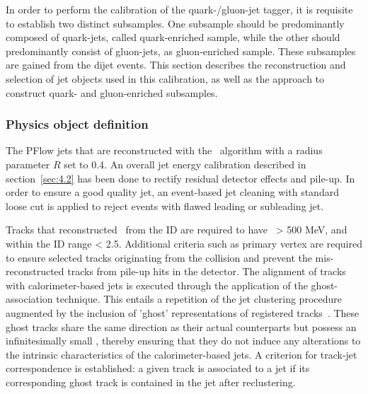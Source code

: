 In order to perform the calibration of the quark-/gluon-jet tagger, it is requisite to establish two distinct subsamples. One subsample should be predominantly composed of quark-jets, called quark-enriched sample, while the other should predominantly consist of gluon-jets, as gluon-enriched sample. These subsamples are gained from the dijet events. This section describes the reconstruction and selection of jet objects used in this calibration, as well as the approach to construct quark- and gluon-enriched subsamples.

\subsubsection{Physics object definition}
\label{subsec:obj}

The PFlow jets that are reconstructed with the \antikt~algorithm with a radius parameter $R$ set to 0.4. An overall jet energy calibration described in section~\ref{sec:4.2} has been done to rectify residual detector effects and pile-up. In order to ensure a good quality jet, an event-based jet cleaning with standard loose cut is applied to reject events with flawed leading or subleading jet.

Tracks that reconstructed~\cite{ATLAS:2017kyn} from the ID are required to have \pt~> 500 MeV, and within the ID range \abseta < 2.5. Additional criteria such as primary vertex are required to ensure selected tracks originating from the collision and prevent the mis-reconstructed tracks from pile-up hits in the detector. The alignment of tracks with calorimeter-based jets is executed through the application of the ghost-association technique. This entails a repetition of the jet clustering procedure augmented by the inclusion of 'ghost' representations of registered tracks~\cite{CACCIARI2008119}. These ghost tracks share the same direction as their actual counterparts but possess an infinitesimally small \pt, thereby ensuring that they do not induce any alterations to the intrinsic characteristics of the calorimeter-based jets. A criterion for track-jet correspondence is established: a given track is associated to a jet if its corresponding ghost track is contained in the jet after reclustering.


